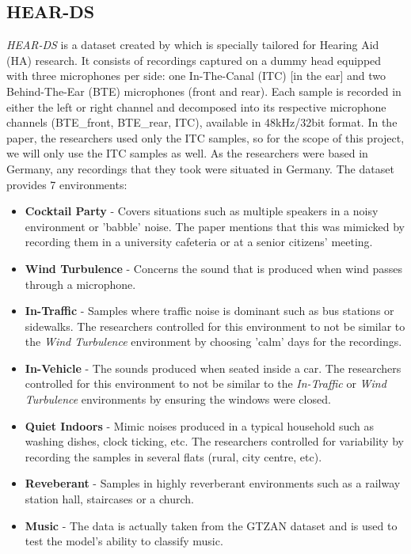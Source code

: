 \documentclass[logo,bsc,singlespacing,parskip,online]{infthesis}
\newcommand{\heards}{\textit{HEAR-DS}\xspace}
\begin{document}
\subsection{HEAR-DS}
\label{sec:hear-ds}
\heards is a dataset created by \citet{Huwel2020HearDS} which is specially tailored for Hearing Aid (HA) research. 
It consists of recordings captured on a dummy head equipped with three microphones per side: one In-The-Canal (ITC) [in the ear] and two Behind-The-Ear (BTE) microphones (front and rear).
Each sample is recorded in either the left or right channel and decomposed into its respective microphone channels (BTE\_front, BTE\_rear, ITC), available in 48kHz/32bit format.
In the paper, the researchers used only the ITC samples, so for the scope of this project, we will only use the ITC samples as well. 
As the researchers were based in Germany, any recordings that they took were situated in Germany.
The dataset provides 7 environments:
\begin{itemize}
   \item \textbf{Cocktail Party} - Covers situations such as multiple speakers in a noisy environment or 'babble' noise. The paper mentions that this was mimicked by recording them in a university cafeteria or at a senior citizens' meeting.
   \item \textbf{Wind Turbulence} - Concerns the sound that is produced when wind passes through a microphone.
   \item \textbf{In-Traffic} - Samples where traffic noise is dominant such as bus stations or sidewalks. The researchers controlled for this environment to not be similar to the \textit{Wind Turbulence} environment by choosing 'calm' days for the recordings.
   \item \textbf{In-Vehicle} - The sounds produced when seated inside a car. The researchers controlled for this environment to not be similar to the \textit{In-Traffic} or \textit{Wind Turbulence} environments by ensuring the windows were closed. 
   \item \textbf{Quiet Indoors} - Mimic noises produced in a typical household such as washing dishes, clock ticking, etc. The researchers controlled for variability by recording the samples in several flats (rural, city centre, etc).
   \item \textbf{Reveberant} - Samples in highly reverberant environments such as a railway station hall, staircases or a church. 
   \item \textbf{Music} - The data is actually taken from the GTZAN dataset \cite{tzanetakis_musical_2002} and is used to test the model's ability to classify music.
\end{itemize}
\end{document}
